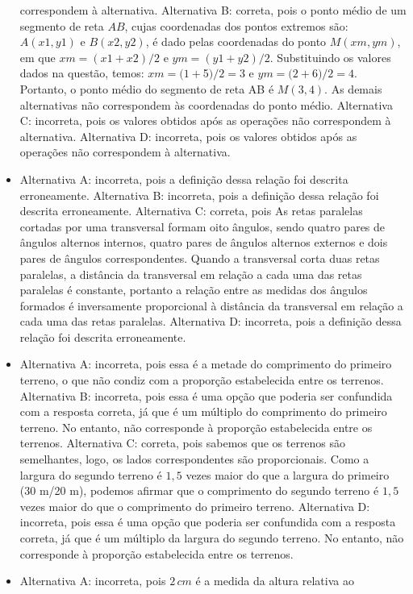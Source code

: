 \begin{itemize}
correspondem à alternativa.
Alternativa B: correta, pois o ponto médio de um segmento de reta $AB$,
cujas coordenadas dos pontos extremos são: 
$A(x1, y1)$ e $B(x2, y2)$, é dado pelas coordenadas do ponto $M(xm, ym)$, em que 
$xm = (x1 + x2)/2$ e $ym = (y1 + y2)/2$. Substituindo os valores dados na questão, temos: $xm = (1 + $5$)/2 = 3$ e $ym = (2 + $6$)/2 = 4$. Portanto, o ponto médio do segmento de reta AB é $M(3, 4)$. As demais alternativas não correspondem às coordenadas do ponto médio.
Alternativa C: incorreta, pois os valores obtidos após as operações não
correspondem à alternativa.
Alternativa D: incorreta, pois os valores obtidos após as operações não
correspondem à alternativa.
\item Alternativa A: incorreta, pois a definição dessa relação foi descrita
erroneamente.
Alternativa B: incorreta, pois a definição dessa relação foi descrita
erroneamente.
Alternativa C: correta, pois As retas paralelas cortadas por uma
transversal formam oito ângulos, sendo quatro pares de ângulos alternos
internos, quatro pares de ângulos alternos externos e dois pares de
ângulos correspondentes. Quando a transversal corta duas retas
paralelas, a distância da transversal em relação a cada uma das retas
paralelas é constante, portanto a relação entre as medidas dos ângulos
formados é inversamente proporcional à distância da transversal em
relação a cada uma das retas paralelas.
Alternativa D: incorreta, pois a definição dessa relação foi descrita
erroneamente.
\item Alternativa A: incorreta, pois essa é a metade do comprimento do
primeiro terreno, o que não condiz com a proporção estabelecida entre os
terrenos.
Alternativa B: incorreta, pois essa é uma opção que poderia ser
confundida com a resposta correta, já que é um múltiplo do comprimento
do primeiro terreno. No entanto, não corresponde à proporção
estabelecida entre os terrenos.
Alternativa C: correta, pois sabemos que os terrenos são semelhantes,
logo, os lados correspondentes são proporcionais. Como a largura do
segundo terreno é $1,5$ vezes maior do que a largura do primeiro (30 m/20
m), podemos afirmar que o comprimento do segundo terreno é $1,5$ vezes
maior do que o comprimento do primeiro terreno.
Alternativa D: incorreta, pois essa é uma opção que poderia ser
confundida com a resposta correta, já que é um múltiplo da largura do
segundo terreno. No entanto, não corresponde à proporção estabelecida
entre os terrenos.
\item Alternativa A: incorreta, pois $2\,cm$ é a medida da altura relativa ao

\end{itemize}
